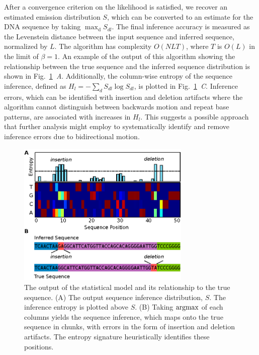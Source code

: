 \documentclass{biophys_letter}
\newcommand{\argmax}{\operatornamewithlimits{argmax}}
\newcommand{\bias}{\beta}
\newcommand{\kje}[1]{\textcolor{BurntOrange}{#1}}
\begin{document}
After a convergence criterion on the likelihood is satisfied, we recover an estimated emission distribution $S$, which can be converted to an estimate for the DNA sequence by taking $\mathrm{\max_{d}} {S_{dl}}$.
The final inference accuracy is measured as the Levenstein distance between the input sequence and inferred sequence, normalized by $L$.
The algorithm has complexity $O(NLT)$, where $T$ is $O(L)$ in the limit of $\bias=1$.
An example of the output of this algorithm showing the relationship between the true sequence and the inferred sequence distribution is shown in Fig.~\ref{fig:inference_output}\emph{~A}.
Additionally, the column-wise entropy of the sequence inference, defined as $H_{l}=-\sum_{d}S_{dl}\log{S_{dl}}$, is plotted in Fig.~\ref{fig:inference_output}\emph{~C}.
Inference errors, which can be identified with insertion and deletion artifacts where the algorithm cannot distinguish between backwards motion and repeat base patterns, are associated with increases in $H_{l}$.
This suggests a possible approach that further analysis might employ to systematically identify and remove inference errors due to bidirectional motion.

\begin{figure}
  \centering
  \includegraphics[width=3.25in]{fig/stochseq-fig2.eps}
  \caption{The output of the statistical model and its relationship to the true sequence. (A) The output sequence inference distribution, $S$. The inference entropy is plotted above $S$. (B) Taking $\argmax$ of each columns yields the sequence inference, which maps onto the true sequence in chunks, with errors in the form of insertion and deletion artifacts. The entropy signature heuristically identifies these positions.}
  \label{fig:inference_output}
\end{figure}
\end{document}
